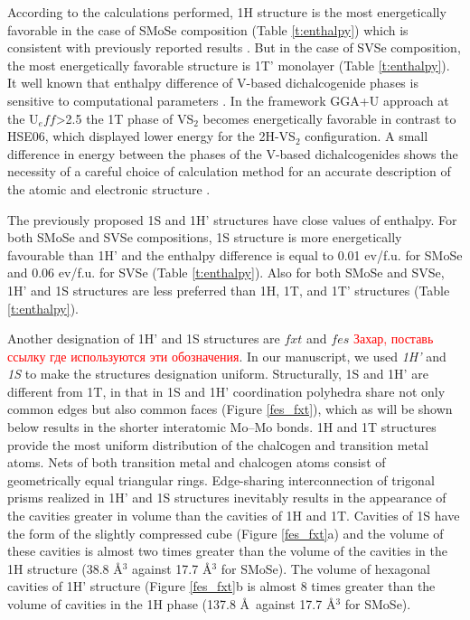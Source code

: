 \documentclass[a4paperm]{article}
\begin{document}
According to the calculations performed, 1H structure is the most energetically favorable in the case of SMoSe composition  (Table \ref{t:enthalpy}) which is consistent with previously reported results \cite{wang20182h}. But in the case of SVSe composition, the most energetically favorable structure is 1T' monolayer (Table \ref{t:enthalpy}). It well known that enthalpy difference of V-based dichalcogenide phases is sensitive to computational parameters \cite{C6CP06732H}. In the framework GGA+U approach at the U$_eff$>2.5 the 1T phase of VS$_2$ becomes energetically favorable \cite{PhysRevB.93.054429} in contrast to HSE06, which displayed lower energy for the 2H-VS$_2$ configuration. A small difference in energy between the phases of the V-based dichalcogenides shows the necessity of a careful choice of calculation method for an accurate description of the atomic and electronic structure \cite{C6CP06732H}.


The previously proposed 1S and 1H' structures \cite{tang2021_janus,ma2016_fxt} have close values of enthalpy.
For both SMoSe and SVSe compositions, 1S structure is more energetically favourable than 1H' and the enthalpy difference is equal to 0.01 ev/f.u. for SMoSe and 0.06 ev/f.u. for SVSe (Table \ref{t:enthalpy}).
Also for both SMoSe and SVSe, 1H' and 1S structures are less preferred than 1H, 1T, and 1T' structures (Table \ref{t:enthalpy}).


Another designation of 1H' and 1S structures are $fxt$ and $fes$ \cite{PhysRevB.93.035442, Terrones_2014,PhysRevB.92.085427}\textcolor{red}{Захар, поставь ссылку где используются эти обозначения}.
In our manuscript, we used {\it 1H'} and {\it 1S} to make the structures designation uniform.
Structurally, 1S and 1H' are different from 1T, in that in 1S and 1H' coordination polyhedra share not only common edges but also common faces (Figure \ref{fes_fxt}), which as will be shown below results in the shorter interatomic Mo--Mo bonds.
1H and 1T structures provide the most uniform distribution of the chalсogen and transition metal atoms.
Nets of both transition metal and chalcogen atoms consist of geometrically equal triangular rings.
Edge-sharing interconnection of trigonal prisms realized in 1H' and 1S structures inevitably results in the appearance of the cavities greater in volume than the cavities of 1H and 1T. 
Cavities of 1S have the form of the slightly compressed cube (Figure \ref{fes_fxt}a) and the volume of these cavities is almost two times greater than the volume of the cavities in the 1H structure (38.8 \AA$^3$ against 17.7 \AA$^3$ for SMoSe).
The volume of hexagonal cavities of 1H' structure (Figure \ref{fes_fxt}b is almost 8 times greater than the volume of cavities in the 1H phase (137.8 \AA\ against 17.7 \AA$^3$ for SMoSe).
\end{document}
